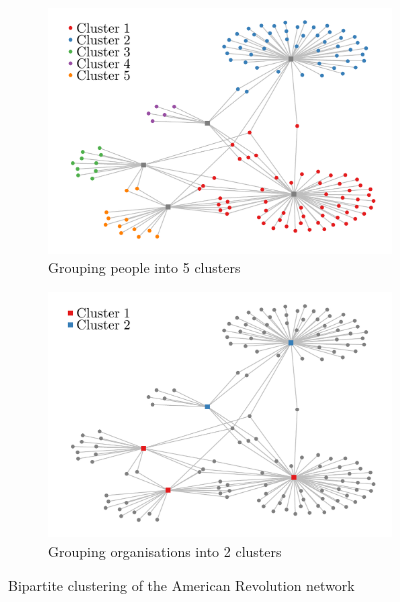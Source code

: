 \begin{figure}[H]
	\begin{subfigure}{.49\textwidth}
		\centering
		\includegraphics[scale=0.4,draft=false]{../../results/american_revolution/american_revolution_source.pdf}
		\caption{Grouping people into 5 clusters}
		\label{fig:bipartite_revolution_source}
	\end{subfigure}
	\begin{subfigure}{.49\textwidth}
		\centering
		\includegraphics[scale=0.4,draft=false]{../../results/american_revolution/american_revolution_dest.pdf}
		\caption{Grouping organisations into 2 clusters}
		\label{fig:bipartite_revolution_dest}
	\end{subfigure}
	\caption{Bipartite clustering of the American Revolution network}
	\label{fig:bipartite_revolution}
\end{figure}














